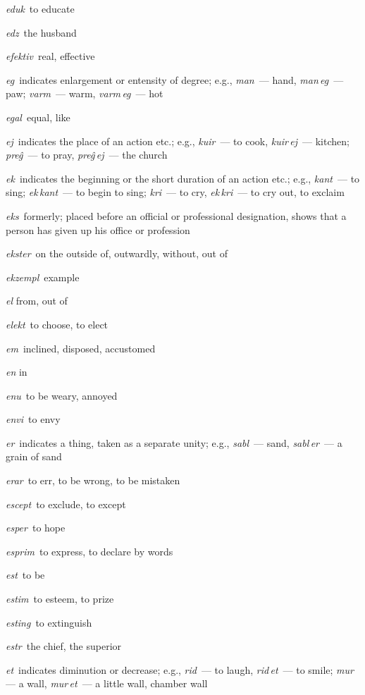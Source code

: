 \begin{landscape}
\begin{multicols}{5}
\begin{outdent}{1em}
\emph{eduk\,} to educate

\emph{edz\,} the husband

\emph{efektiv\,} real, effective

\emph{eg\,} indicates enlargement or entensity of degree; e.g., \emph{man\,} — hand, \emph{man\,eg\,} — paw; \emph{varm\,} — warm, \emph{varm\,eg\,} — hot

\emph{egal\,} equal, like

\emph{ej\,} indicates the place of an action etc.; e.g., \emph{kuir\,} — to cook, \emph{kuir\,ej\,} — kitchen; \emph{preĝ\,} — to pray, \emph{preĝ\,ej\,} — the church

\emph{ek\,} indicates the beginning or the short duration of an action etc.; e.g., \emph{kant\,} — to sing; \emph{ek\,kant\,} — to begin to sing; \emph{kri\,} — to cry, \emph{ek\,kri\,} — to cry out, to exclaim

\emph{eks\,} formerly; placed before an official or professional designation, shows that a person has given up his office or profession

\emph{ekster\,} on the outside of, outwardly, without, out of

\emph{ekzempl\,} example

\emph{el} from, out of

\emph{elekt\,} to choose, to elect

\emph{em\,} inclined, disposed, accustomed

\emph{en} in

\emph{enu\,} to be weary, annoyed

\emph{envi\,} to envy

\emph{er\,} indicates a thing, taken as a separate unity; e.g., \emph{sabl\,} — sand, \emph{sabl\,er\,} — a grain of sand

\emph{erar\,} to err, to be wrong, to be mistaken

\emph{escept\,} to exclude, to except

\emph{esper\,} to hope

\emph{esprim\,} to express, to declare by words

\emph{est\,} to be

\emph{estim\,} to esteem, to prize

\emph{esting\,} to extinguish

\emph{estr\,} the chief, the superior

\emph{et\,} indicates diminution or decrease; e.g., \emph{rid\,} — to laugh, \emph{rid\,et\,} — to smile; \emph{mur\,} — a wall, \emph{mur\,et\,} — a little wall, chamber wall


\end{outdent}
\end{multicols}
\end{landscape}

